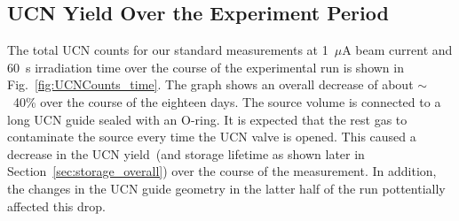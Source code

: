 


\subsection{UCN Yield Over the Experiment Period}

The total UCN counts for our standard measurements at 1~$\mu$A beam
current and 60~s irradiation time over the course of the experimental
run is shown in Fig.~\ref{fig:UCNCounts_time}. The graph shows an
overall decrease of about $\sim$~40\% over the course of the eighteen
days. The source volume is connected to a long UCN guide sealed with
an O-ring. It is expected that the rest gas to contaminate the source
every time the UCN valve is opened. This caused a decrease in the UCN
yield~(and storage lifetime as shown later in
Section~\ref{sec:storage_overall}) over the course of the
measurement. In addition, the changes in the UCN guide geometry in the
latter half of the run pottentially affected this drop.


